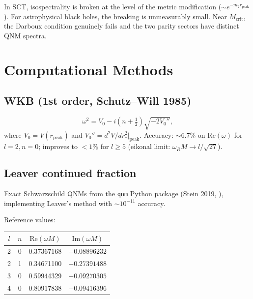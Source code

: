\documentclass[11pt,a4paper]{article}
\newcommand{\Mcrit}{M_{\mathrm{crit}}}
\begin{document}
In SCT, isospectrality is broken at the level of the
metric modification ($\sim e^{-m_2 r_{\mathrm{peak}}}$).
For astrophysical black holes, the breaking is unmeasurably small.
Near $\Mcrit$, the Darboux condition genuinely fails and the two
parity sectors have distinct QNM spectra.

\section{Computational Methods}\label{sec:methods}

\subsection{WKB (1st order, Schutz--Will 1985)}

\begin{equation}
\omega^2 = V_0 - i\left(n + \tfrac{1}{2}\right)\sqrt{-2V_0''},
\end{equation}
where $V_0 = V(r_{\mathrm{peak}})$ and $V_0'' = d^2V/dr_*^2|_{\mathrm{peak}}$.
Accuracy: $\sim 6.7\%$ on $\mathrm{Re}(\omega)$ for $l=2, n=0$;
improves to $<1\%$ for $l \geq 5$ (eikonal limit:
$\omega_R M \to l/\sqrt{27}$).

\subsection{Leaver continued fraction}

Exact Schwarzschild QNMs from the \texttt{qnm} Python package
(Stein 2019, \cite{Stein:qnm}), implementing Leaver's method
\cite{Leaver:1985} with $\sim 10^{-11}$ accuracy.

Reference values:
\begin{center}
\begin{tabular}{cccc}
\toprule
$l$ & $n$ & $\mathrm{Re}(\omega M)$ & $\mathrm{Im}(\omega M)$ \\
\midrule
2 & 0 & 0.37367168 & $-0.08896232$ \\
2 & 1 & 0.34671100 & $-0.27391488$ \\
3 & 0 & 0.59944329 & $-0.09270305$ \\
4 & 0 & 0.80917838 & $-0.09416396$ \\
\bottomrule
\end{tabular}
\end{center}

\end{document}
